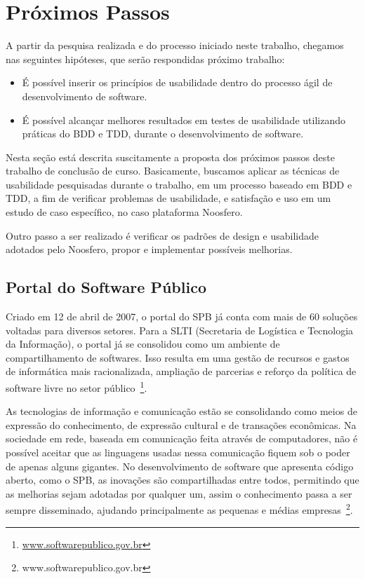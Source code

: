 \section{Próximos Passos}

A partir da pesquisa realizada e do processo iniciado neste trabalho, chegamos nas seguintes hipóteses, que serão respondidas próximo trabalho: 
\begin{itemize}
\item É possível inserir os princípios de usabilidade dentro do processo ágil de desenvolvimento de software.
\item É possível alcançar melhores resultados em testes de usabilidade utilizando práticas do BDD e TDD, durante o desenvolvimento de software.
\end{itemize}

Nesta seção está descrita suscitamente a proposta dos próximos passos deste trabalho de conclusão de curso. Basicamente, buscamos aplicar as técnicas de usabilidade pesquisadas durante o trabalho, em um processo baseado em BDD e TDD, a fim de verificar problemas de usabilidade, e satisfação e uso em um estudo de caso específico, no caso plataforma Noosfero. 

Outro passo a ser realizado é verificar os padrões de design e usabilidade adotados pelo Noosfero, propor  e implementar possíveis melhorias.

\subsection{Portal do Software Público}

Criado em 12 de abril de 2007, o portal do SPB já conta com mais de 60 soluções voltadas para diversos setores. Para a SLTI (Secretaria de Logística e Tecnologia da Informação), o portal já se consolidou como um ambiente de compartilhamento de softwares. Isso resulta em uma gestão de recursos e gastos de informática mais racionalizada, ampliação de parcerias e reforço da política de software livre no setor público~\footnote{\url{www.softwarepublico.gov.br}}. 

As tecnologias de informação e comunicação estão se consolidando como meios de expressão do conhecimento, de expressão cultural e de transações econômicas. Na sociedade em rede, baseada em comunicação feita através de computadores, não é possível aceitar que as linguagens usadas nessa comunicação fiquem sob o poder de apenas alguns gigantes. No desenvolvimento de software que apresenta código aberto, como o SPB, as inovações são compartilhadas entre todos, permitindo que as melhorias sejam adotadas por qualquer um, assim o conhecimento passa a ser sempre disseminado, ajudando principalmente as pequenas e médias empresas~\footnote{www.softwarepublico.gov.br}.

